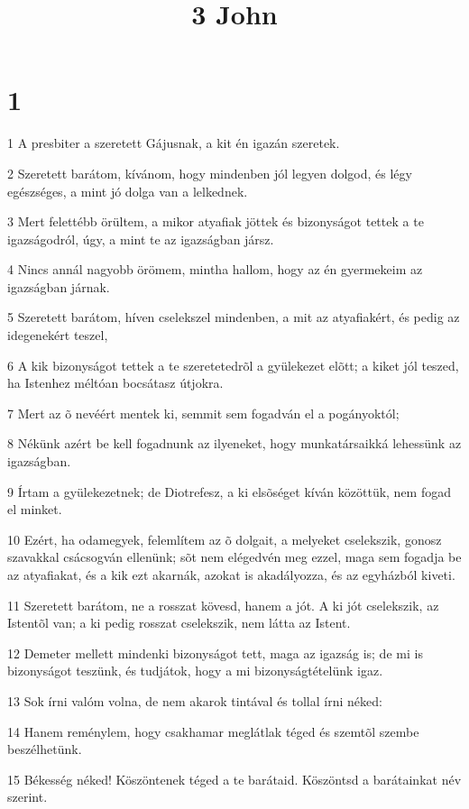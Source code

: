 

\title{3 John}


\chapter{1}

\par 1 A presbiter a szeretett Gájusnak, a kit én igazán szeretek.
\par 2 Szeretett barátom, kívánom, hogy mindenben jól legyen dolgod, és légy egészséges, a mint jó dolga van a lelkednek.
\par 3 Mert felettébb örültem, a mikor atyafiak jöttek és bizonyságot tettek a te igazságodról, úgy, a mint te az igazságban jársz.
\par 4 Nincs annál nagyobb örömem, mintha hallom, hogy az én gyermekeim az igazságban járnak.
\par 5 Szeretett barátom, híven cselekszel mindenben, a mit az atyafiakért, és pedig az idegenekért teszel,
\par 6 A kik bizonyságot tettek a te szeretetedrõl a gyülekezet elõtt; a kiket jól teszed, ha Istenhez méltóan bocsátasz útjokra.
\par 7 Mert az õ nevéért mentek ki, semmit sem fogadván el a pogányoktól;
\par 8 Nékünk azért be kell fogadnunk az ilyeneket, hogy munkatársaikká lehessünk az igazságban.
\par 9 Írtam a gyülekezetnek; de Diotrefesz, a ki elsõséget kíván közöttük, nem fogad el minket.
\par 10 Ezért, ha odamegyek, felemlítem az õ dolgait, a melyeket cselekszik, gonosz szavakkal csácsogván ellenünk; sõt nem elégedvén meg ezzel, maga sem fogadja be az atyafiakat, és a kik ezt akarnák, azokat is akadályozza, és az egyházból kiveti.
\par 11 Szeretett barátom, ne a rosszat kövesd, hanem a jót. A ki jót cselekszik, az Istentõl  van; a ki pedig rosszat cselekszik, nem látta az Istent.
\par 12 Demeter mellett mindenki bizonyságot tett, maga az igazság is; de mi is bizonyságot teszünk, és tudjátok, hogy a mi bizonyságtételünk igaz.
\par 13 Sok írni valóm volna, de nem akarok tintával és tollal írni néked:
\par 14 Hanem reménylem, hogy csakhamar meglátlak téged és szemtõl szembe beszélhetünk.
\par 15 Békesség néked! Köszöntenek téged a te barátaid. Köszöntsd a barátainkat név szerint.


